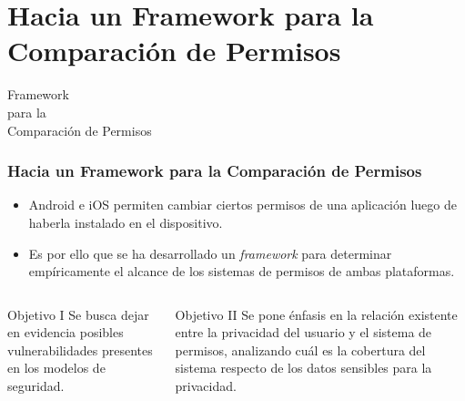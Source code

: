 \section{Hacia un Framework para la Comparación de Permisos}
\begin{frame}
 \begin{center}
  \LARGE Framework \\para la \\Comparación de Permisos
 \end{center}
\end{frame}
\begin{frame}
 \frametitle{Hacia un Framework para la Comparación de Permisos}
 \begin{itemize}
  \item Android e iOS permiten cambiar ciertos permisos de una aplicación luego de haberla instalado en el dispositivo.
  \item Es por ello que se ha desarrollado un \textit{framework} para determinar empíricamente el alcance de los sistemas de permisos de ambas plataformas.
 \end{itemize}
 \begin{columns}
  \begin{column}[]{.35\textwidth}
   \begin{exampleblock}{Objetivo I}
    {Se busca dejar en evidencia posibles vulnerabilidades presentes en los modelos de seguridad.}
   \end{exampleblock}
  \end{column}
  \begin{column}[]{.60\textwidth}
   \begin{exampleblock}{Objetivo II}
    {Se pone énfasis en la relación existente entre la privacidad del usuario y el sistema de permisos, analizando cuál es la cobertura del sistema respecto de los datos sensibles para la privacidad.}
   \end{exampleblock}
  \end{column}
 \end{columns}
\end{frame}
